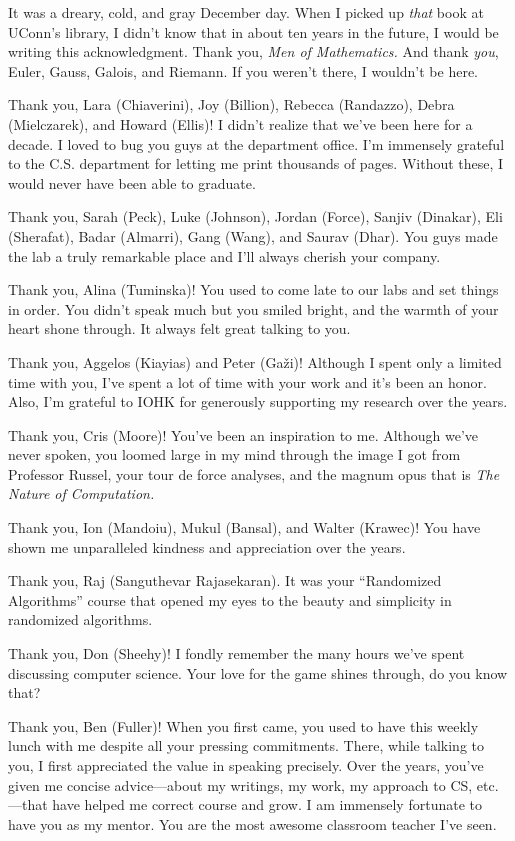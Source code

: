   It was a dreary, cold, and gray December day. When I picked up \emph{that} book at UConn's library, 
  I didn't know that in about ten years in the future, 
  I would be writing this acknowledgment. 
  Thank you, \emph{Men of Mathematics.} And thank \emph{you}, 
  Euler, Gauss, Galois, and Riemann. If you weren't there, 
  I wouldn't be here.

  \AckBreak
  Thank you, Lara (Chiaverini), Joy (Billion), Rebecca (Randazzo), 
  Debra (Mielczarek), and Howard (Ellis)! 
  I didn't realize that we've been here for a decade. 
  I loved to bug you guys at the department office. 
  I'm immensely grateful to the C.S. department 
  for letting me print thousands of pages. 
  Without these, I would never have been able to graduate.

  Thank you, Sarah (Peck), Luke (Johnson), Jordan (Force), Sanjiv (Dinakar), 
  Eli (Sherafat), Badar (Almarri), Gang (Wang), and Saurav (Dhar). 
  You guys made the lab a truly remarkable place and 
  I'll always cherish your company.

  Thank you, Alina (Tuminska)! 
  You used to come late to our labs 
  and set things in order. 
  You didn't speak much 
  but you smiled bright, and 
  the warmth of your heart 
  shone through. 
  It always felt great talking to you. 
  
  \AckBreak
  Thank you, Aggelos (Kiayias) and Peter (Ga\v{z}i)! 
  Although I spent only a limited time with you, 
  I've spent a lot of time with your work 
  and it's been an honor. 
  Also, I'm grateful to IOHK for generously supporting my research 
  over the years.

  Thank you, Cris (Moore)! You've been an inspiration to me. 
  Although we've never spoken, 
  you loomed large in my mind through the image I got from Professor Russel,
  your tour de force analyses, 
  and the magnum opus that is \emph{The Nature of Computation.}

  Thank you, Ion (Mandoiu), Mukul (Bansal), and Walter (Krawec)! 
  You have shown me unparalleled kindness and appreciation over the years.

  Thank you, Raj (Sanguthevar Rajasekaran). 
  It was your ``Randomized Algorithms'' course that 
  opened my eyes to the beauty and simplicity 
  in randomized algorithms.

  Thank you, Don (Sheehy)! I fondly remember 
  the many hours we've spent discussing 
  computer science. 
  Your love for the game shines through, do you know that? 

  Thank you, Ben (Fuller)! 
  When you first came, 
  you used to have this weekly lunch with me 
  despite all your pressing commitments. 
  There, while talking to you, 
  I first appreciated the value in speaking precisely. 
  Over the years, 
  you've given me concise advice---about my writings, my work, my approach to CS, etc.---that 
  have helped me correct course and grow. 
  I am immensely fortunate to have you as my mentor.
  You are the most awesome classroom teacher I've seen.

